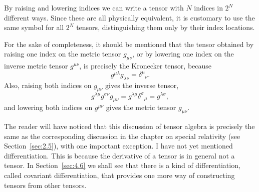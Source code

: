 By raising and lowering indices we can write a tensor with \(N\) indices in
\(2^N\) different ways. Since these are all physically equivalent, it is
customary to use the same symbol for all \(2^N\) tensors, distinguishing them
only by their index locations.

For the sake of completeness, it should be mentioned that the tensor obtained
by raising one index on the metric tensor \(g_{\mu\nu}\), or by lowering one
index on the inverse metric tensor \(g^{\mu\nu}\), is precisely the Kronecker
tensor, because
\[
  g^{\mu\lambda}g_{\lambda\nu}=\delta^\mu{}_\nu.
\]
Also, raising both indices on \(g_{\mu\nu}\) gives the inverse tensor,
\[
  g^{\lambda\mu}g^{\sigma\nu}g_{\mu\nu}
  =g^{\lambda\mu}\delta^\sigma{}_\mu
  =g^{\lambda\sigma},
\]
and lowering both indices on \(g^{\mu\nu}\) gives the metric tensor
\(g_{\mu\nu}\).

The reader will have noticed that this discussion of tensor algebra is
precisely the same as the corresponding discussion in the chapter on special
relativity (see Section~\ref{sec:2.5}), with one important exception. I have
not yet mentioned differentiation. This is because the derivative of a tensor
is in general not a tensor. In Section~\ref{sec:4.6} we shall see that there
is a kind of differentiation, called covariant differentiation, that provides
one more way of constructing tensors from other tensors.

